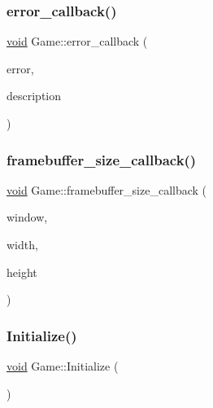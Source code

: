 \subsubsection{\texorpdfstring{error\+\_\+callback()}{error\_callback()}}
{\footnotesize\ttfamily \hyperlink{imgui__impl__opengl3__loader_8h_ac668e7cffd9e2e9cfee428b9b2f34fa7}{void} Game\+::error\+\_\+callback (\begin{DoxyParamCaption}\item[{int}]{error,  }\item[{const char $\ast$}]{description }\end{DoxyParamCaption})}

\mbox{\label{classGame_add1087a248a7e136debe003af25f9fa2}} 
\subsubsection{\texorpdfstring{framebuffer\+\_\+size\+\_\+callback()}{framebuffer\_size\_callback()}}
{\footnotesize\ttfamily \hyperlink{imgui__impl__opengl3__loader_8h_ac668e7cffd9e2e9cfee428b9b2f34fa7}{void} Game\+::framebuffer\+\_\+size\+\_\+callback (\begin{DoxyParamCaption}\item[{G\+L\+F\+Wwindow $\ast$}]{window,  }\item[{int}]{width,  }\item[{int}]{height }\end{DoxyParamCaption})}

\mbox{\label{classGame_adc01a7fae5261c95f7e6b41024e6c533}} 
\subsubsection{\texorpdfstring{Initialize()}{Initialize()}}
{\footnotesize\ttfamily \hyperlink{imgui__impl__opengl3__loader_8h_ac668e7cffd9e2e9cfee428b9b2f34fa7}{void} Game\+::\+Initialize (\begin{DoxyParamCaption}{ }\end{DoxyParamCaption})}

\mbox{\label{classGame_a1622ae34c02e33376dabde5294c9a8e8}} 
